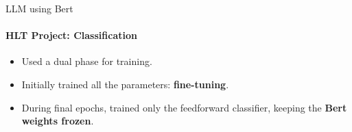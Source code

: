 \documentclass{beamer}
\theoremstyle{definition}
\theoremstyle{plain}
\begin{document}
\begin{frame}{LLM using Bert}
\framesubtitle{HLT Project: Classification}
{\small
\vspace{-0.1cm}
\begin{itemize}
    \item<1-> Used a dual phase for training.
    \item<1-> Initially trained all the parameters: \textbf{fine-tuning}.
    \item<2-> During final epochs, trained only the feedforward classifier, keeping the \textbf{Bert weights frozen}.
\end{itemize}
}

\begin{figure}
    \centering
\end{figure}
\end{frame}
\end{document}
